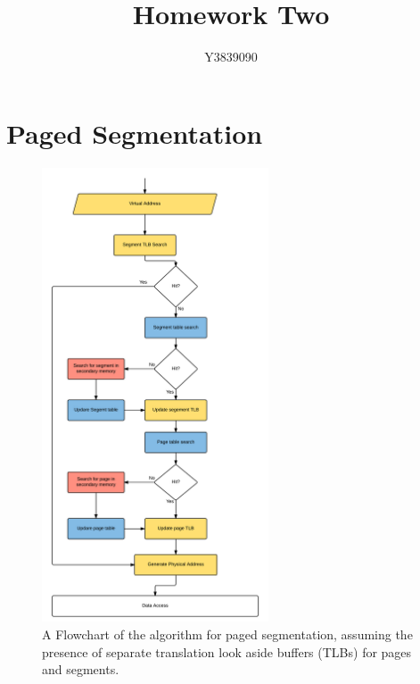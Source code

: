 \documentclass[12pt]{article}
\title{Homework Two}
\author{Y3839090}
\begin{document}
\maketitle

\tableofcontents %
\newpage
\listoffigures %
\listoftables %
\newpage
{} %

	\section{Paged Segmentation}

		\begin{figure}[H]
			\centering
			\includegraphics[width=0.6\textwidth]{Paged_Segmentation_Flowchart.png}
			\caption{ A Flowchart of the algorithm for paged segmentation, assuming the presence of separate translation look aside buffers (TLBs) for pages and segments.}
		\end{figure}
\end{document}
